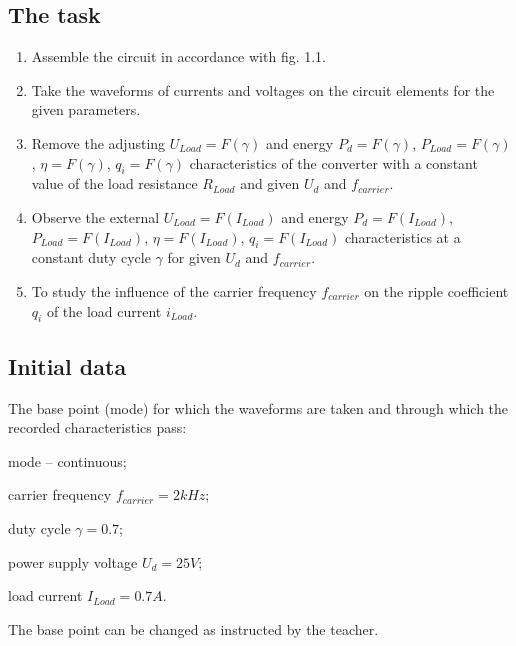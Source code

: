 \documentclass[a4paper,14pt]{article}
\begin{document}
\subsection{The task}

\begin{enumerate}
\item Assemble the circuit in accordance with fig. 1.1.

\item Take the waveforms of currents and voltages on the circuit elements for the given parameters.

\item Remove the adjusting $U_{Load}=F(\gamma)$ and energy $P_d=F(\gamma)$, $P_{Load}=F(\gamma)$, $\eta = F(\gamma)$,  $q_i = F(\gamma)$ characteristics of the converter with a constant value of the load resistance $R_{Load}$ and given $U_d$ and $f_{carrier}$.

\item Observe the external $U_{Load} = F(I_{Load})$ and energy $P_d=F(I_{Load})$, $P_{Load}=F(I_{Load})$, 
$\eta = F(I_{Load})$, $q_i=F(I_{Load})$ characteristics at a constant duty cycle $\gamma$ for given $U_d$ and 
$f_{carrier}$.

\item To study the influence of the carrier frequency $f_{carrier}$ on the ripple coefficient $q_i$ of 
	the load current $i_{Load}$.
\end{enumerate}

\subsection{Initial data}

The base point (mode) for which the waveforms are taken and through which the recorded characteristics pass:
\begin{description}
	\item mode -- continuous;

	\item carrier frequency $f_{carrier}=2 kHz$;

	\item duty cycle $\gamma=0.7$;

	\item power supply voltage $U_d=25 V$;

	\item load current $I_{Load} =0.7 A$.
\end{description}
The base point can be changed as instructed by the teacher.
\end{document}

